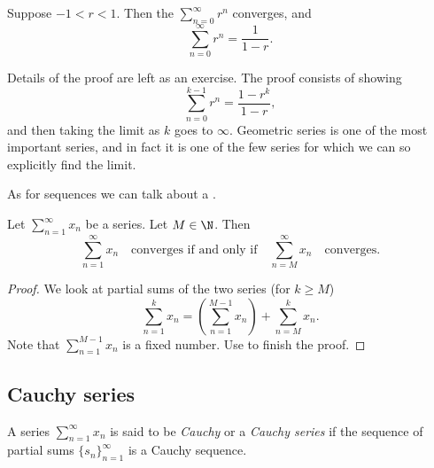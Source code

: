 \begin{prop} \label{geometric:prop}
Suppose
$-1 < r < 1$.  Then the \emph{}
$\sum_{n=0}^\infty r^n$ converges, and
\begin{equation*}
\sum_{n=0}^\infty r^n = \frac{1}{1-r} .
\end{equation*}
\end{prop}

Details of the proof are left as an exercise.
The proof consists of showing 
\begin{equation*}
\sum_{n=0}^{k-1} r^n = \frac{1-r^k}{1-r} ,
\end{equation*}
and then taking the limit as $k$ goes to $\infty$.
Geometric series is one of the most important series, and in fact it is
one of the few series for which we can so explicitly find the limit.

\medskip

\pagebreak[2]
As for sequences we can talk about a \emph{}.

\begin{prop}
Let $\sum_{n=1}^\infty x_n$ be a series.  Let $M \in \N$.  Then
\begin{equation*}
\sum_{n=1}^\infty x_n \quad \text{converges if and only if} \quad
\sum_{n=M}^\infty x_n \quad \text{converges.}
\end{equation*}
\end{prop}

\begin{proof}
We look at partial sums of the two series (for $k \geq M$)
\begin{equation*}
\sum_{n=1}^{k} x_n
=
\left(
\sum_{n=1}^{M-1} x_n
\right)
+
\sum_{n=M}^{k} x_n .
\end{equation*}
Note that 
$\sum_{n=1}^{M-1} x_n$ is a fixed number.  Use
 to finish the proof.
\end{proof}

\subsection{Cauchy series}

\begin{defn}
A series $\sum_{n=1}^\infty x_n$ is said to be \emph{Cauchy} or a
\emph{Cauchy series}
if the sequence of partial sums $\{ s_n \}_{n=1}^\infty$ is a Cauchy sequence.
\end{defn}

